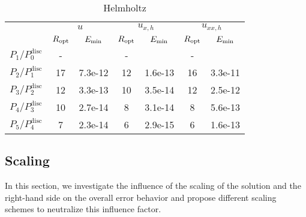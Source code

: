 \documentclass[final,3p]{elsarticle}
\begin{document}
\begin{table}[!ht]
\centering
\begin{subtable}{0.5\textwidth}
\centering
\begin{tabular}{|c|c|c|c|c|c|c|} \hline  
{} & \multicolumn{2}{c|}{$u$} & \multicolumn{2}{c|}{$u_{x,h}$} & \multicolumn{2}{c|}{$u_{xx,h}$}  \\
\cline{2-7}
 & $R_{\rm opt}$ & $E_{\rm min}$ & $R_{\rm opt}$ & $E_{\rm min}$ & $R_{\rm opt}$ & $E_{\rm min}$ \\		%
\hline
$P_1/P_0^{\text{disc}}$ & - & & - & & - &  \\		%
\hline
$P_2/P_1^{\text{disc}}$ & 17 & 7.3e-12 & 12 & 1.6e-13 & 16 & 3.3e-11 \\		%
\hline
$P_3/P_2^{\text{disc}}$ & 12 & 3.3e-13 & 10 & 3.5e-14 & 12 & 2.5e-12 \\
\hline
$P_4/P_3^{\text{disc}}$ & 10 & 2.7e-14 & 8 & 3.1e-14 & 8 & 5.6e-13 \\	%
\hline
$P_5/P_4^{\text{disc}}$ & 7 & 2.3e-14 & 6 & 2.9e-15 & 6 & 1.6e-13 \\	%
\hline
\end{tabular}
\caption[sss]{Helmholtz}
\end{subtable}
\end{table}


\newpage
\subsection{Scaling}	\label{section_scaling}

In this section, we investigate the influence of the scaling of the solution and the right-hand side on the overall error behavior and propose different scaling schemes to neutralize this influence factor.
\end{document}
